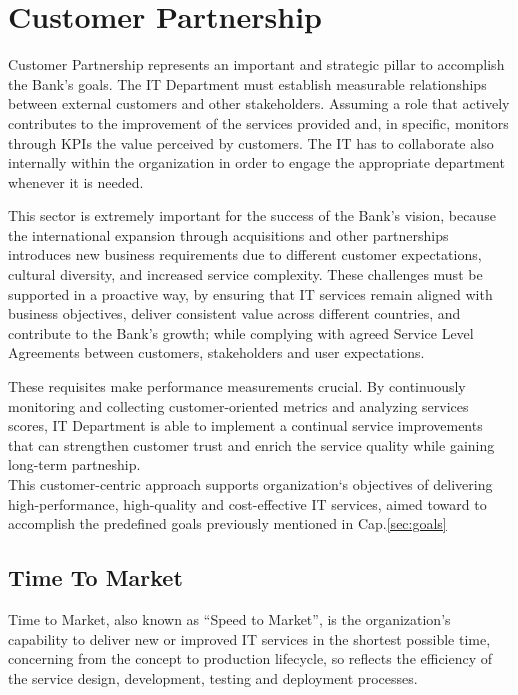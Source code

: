\chapter{Customer Partnership}

Customer Partnership represents an important and strategic pillar to accomplish the Bank's goals. The IT Department must establish measurable relationships between external customers and other stakeholders. Assuming a role that actively contributes to the improvement of the services provided and, in specific, monitors through KPIs the value perceived by customers.
The IT has to collaborate also internally within the organization in order to engage the appropriate department whenever it is needed.

This sector is extremely important for the success of the Bank's vision, because the international expansion through acquisitions and other partnerships introduces new business requirements due to different customer expectations, cultural diversity, and increased service complexity.
These challenges must be supported in a proactive way, by ensuring that IT services remain aligned with business objectives, deliver consistent value across different countries, and contribute to the Bank's growth; while complying with agreed Service Level Agreements between customers, stakeholders and user expectations.


These requisites make performance measurements crucial. By continuously monitoring and collecting customer-oriented metrics and analyzing services scores, IT Department is able to implement a continual service improvements that can strengthen customer trust and enrich the service quality while gaining long-term partneship. \\
This customer-centric approach supports organization`s objectives of delivering high-performance, high-quality and cost-effective IT services, aimed toward to accomplish the predefined goals previously mentioned in Cap.\ref{sec:goals}


\section{Time To Market}
\label{subs:timetomarket}

Time to Market, also known as ``Speed to Market'', is the organization's capability to deliver new or improved IT services in the shortest possible time, concerning from the concept to production lifecycle, so reflects the efficiency of the service design, development, testing and deployment processes.

